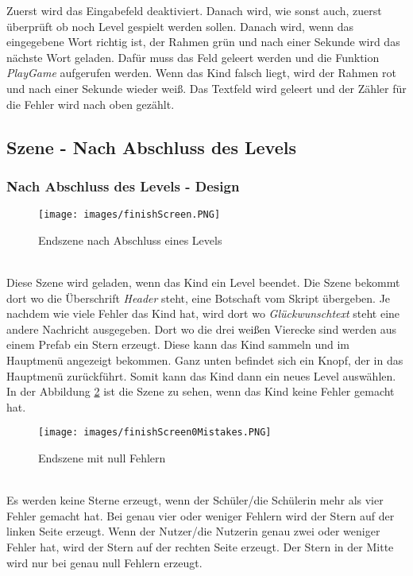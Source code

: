 Zuerst wird das Eingabefeld deaktiviert. Danach wird, wie sonst auch, zuerst überprüft ob noch Level gespielt werden sollen. Danach wird, wenn das eingegebene Wort richtig ist, der Rahmen grün und nach einer Sekunde wird das nächste Wort geladen. Dafür muss das Feld geleert werden und die Funktion \textit{PlayGame} aufgerufen werden. Wenn das Kind falsch liegt, wird der Rahmen rot und nach einer Sekunde wieder weiß. Das Textfeld wird geleert und der Zähler für die Fehler wird nach oben gezählt.
\subsection{Szene - Nach Abschluss des Levels}
\subsubsection{Nach Abschluss des Levels - Design}
\begin{figure}[htbp]
  \centering
  \texttt{[image: images/finishScreen.PNG]}
  \caption{Endszene nach Abschluss eines Levels}
  \label{finishSzene}
\end{figure}\\
Diese Szene wird geladen, wenn das Kind ein Level beendet. Die Szene bekommt dort wo die Überschrift \textit{Header} steht, eine Botschaft vom Skript übergeben. Je nachdem wie viele Fehler das Kind hat, wird dort wo \textit{Glückwunschtext} steht eine andere Nachricht ausgegeben. Dort wo die drei weißen Vierecke sind werden aus einem Prefab ein Stern erzeugt. Diese kann das Kind sammeln und im Hauptmenü angezeigt bekommen. Ganz unten befindet sich ein Knopf, der in das Hauptmenü zurückführt. Somit kann das Kind dann ein neues Level auswählen. In der Abbildung \ref{withoutError} ist die Szene zu sehen, wenn das Kind keine Fehler gemacht hat.
\begin{figure}[htbp]
  \centering
  \texttt{[image: images/finishScreen0Mistakes.PNG]}
  \caption{Endszene mit null Fehlern}
  \label{withoutError}
\end{figure}\\
Es werden keine Sterne erzeugt, wenn der Schüler/die Schülerin mehr als vier Fehler gemacht hat. Bei genau vier oder weniger Fehlern wird der Stern auf der linken Seite erzeugt. Wenn der Nutzer/die Nutzerin genau zwei oder weniger Fehler hat, wird der Stern auf der rechten Seite erzeugt. Der Stern in der Mitte wird nur bei genau null Fehlern erzeugt.
